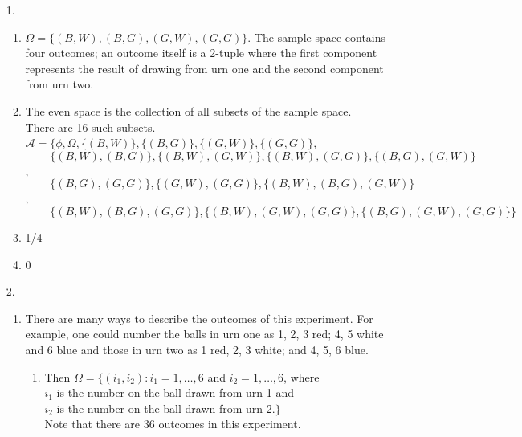 \begin{enumerate}
	\item[1.] \begin{enumerate}
		
		\item $\Omega = \{(B,W), (B,G), (G,W), (G,G)\}$.  The sample space contains four outcomes; an outcome itself is a 2-tuple where the first component represents the result of drawing from urn one and the second component from urn two.
		
		\item The even space is the collection of all subsets of the sample space. \\
		There are 16 such subsets. \\
		${\mathscr A} = \Big\{ \phi, \Omega, \{(B,W)\}, \{(B,G)\}, \{(G,W)\}, \{(G,G)\}$, \\
		$\phantom{{\mathscr A} = }\{(B,W), (B,G)\}, \{(B,W),(G,W)\}, \{(B,W), (G,G)\}, \{(B,G), (G,W)\}$, \\ 
		$\phantom{{\mathscr A} = }\{(B,G),(G,G)\}, \{(G,W), (G,G)\}, \{(B,W), (B,G), (G,W)\}$,\\ 
		$\phantom{{\mathscr A} = }\{(B,W), (B,G), (G,G)\}, \{(B,W), (G,W), (G,G)\}, \{(B,G), (G,W), (G,G)\} \Big\}$

		\item 1/4
		
		\item 0
	
		\end{enumerate}
	\item[2.] \begin{enumerate}
		
		\item There are many ways to describe the outcomes of this experiment.  For example, one could number the balls in urn one as 1, 2, 3 red; 4, 5 white and 6 blue and those in urn two as 1 red, 2, 3 white; and 4, 5, 6 blue.
		
		\begin{enumerate}
			
			\item Then $\Omega = \{(i_1,i_2)\colon i_1=1,\ldots,6$ and $i_2=1,\ldots, 6$, where \\
			$i_1$ is the number on the ball drawn from urn 1 and \\
			$i_2$ is the number on the ball drawn from urn 2.$\}$\\
			Note that there are 36 outcomes in this experiment. 
		

\end{enumerate}
\end{enumerate}
\end{enumerate}
